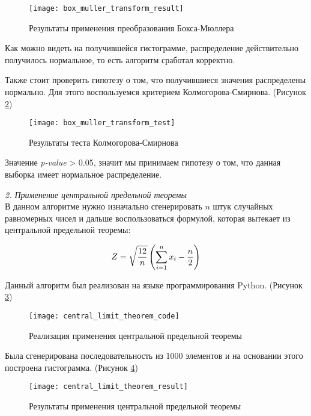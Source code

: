 \begin{figure}[h]
	\centering \texttt{[image: box\_muller\_transform\_result]}
	\caption{Результаты применения преобразования Бокса-Мюллера}
	\label{fig:box_muller_transform_result}
\end{figure}

Как можно видеть на получившейся гистограмме, распределение действительно получилось нормальное, то есть алгоритм сработал корректно.

\newpage
Также стоит проверить гипотезу о том, что получившиеся значения распределены нормально. Для этого воспользуемся критерием Колмогорова-Смирнова. (Рисунок \ref{fig:box_muller_transform_test})
\begin{figure}[h]
	\centering \texttt{[image: box\_muller\_transform\_test]}
	\caption{Результаты теста Колмогорова-Смирнова}
	\label{fig:box_muller_transform_test}
\end{figure}

Значение \textit{p-value} > 0.05, значит мы принимаем гипотезу о том, что данная выборка имеет нормальное распределение.

\vspace{1cm}

\textit{2. Применение центральной предельной теоремы}\\

В данном алгоритме нужно изначально сгенерировать $n$ штук случайных равномерных чисел и дальше воспользоваться формулой, которая вытекает из центральной предельной теоремы:
\begin{ceqn}
	\begin{align*}
		Z = \sqrt{\dfrac{12}{n}}\left(\smashoperator[r]{\sum_{i=1}^{n}} x_i - \dfrac{n}{2}\right)
	\end{align*}
\end{ceqn}

Данный алгоритм был реализован на языке программирования Python. (Рисунок \ref{fig:central_limit_theorem_code})
\begin{figure}[h]
	\centering \texttt{[image: central\_limit\_theorem\_code]}
	\caption{Реализация применения центральной предельной теоремы}
	\label{fig:central_limit_theorem_code}
\end{figure}

\newpage
Была сгенерирована последовательность из 1000 элементов и на основании этого построена гистограмма. (Рисунок \ref{fig:central_limit_theorem_result})

\begin{figure}[h]
	\centering \texttt{[image: central\_limit\_theorem\_result]}
	\caption{Результаты применения центральной предельной теоремы}
	\label{fig:central_limit_theorem_result}
\end{figure}

